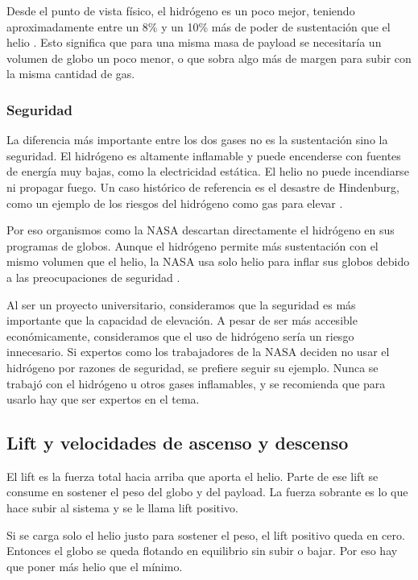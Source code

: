 \documentclass[12pt,a4paper]{article}
\begin{document}
Desde el punto de vista físico, el hidrógeno es un poco mejor, teniendo aproximadamente entre un 8\% y un 10\% más de poder de sustentación que el helio \cite{ref78}. Esto significa que para una misma masa de payload se necesitaría un volumen de globo un poco menor, o que sobra algo más de margen para subir con la misma cantidad de gas.

\subsubsection{Seguridad}\label{seguridad}

La diferencia más importante entre los dos gases no es la sustentación sino la seguridad. El hidrógeno es altamente inflamable y puede encenderse con fuentes de energía muy bajas, como la electricidad estática. El helio no puede incendiarse ni propagar fuego. Un caso histórico de referencia es el desastre de Hindenburg, como un ejemplo de los riesgos del hidrógeno como gas para elevar \cite{ref78}.

Por eso organismos como la NASA descartan directamente el hidrógeno en sus programas de globos. Aunque el hidrógeno permite más sustentación con el mismo volumen que el helio, la NASA usa solo helio para inflar sus globos debido a las preocupaciones de seguridad \cite{ref79}.

Al ser un proyecto universitario, consideramos que la seguridad es más importante que la capacidad de elevación. A pesar de ser más accesible económicamente, consideramos que el uso de hidrógeno sería un riesgo innecesario. Si expertos como los trabajadores de la NASA deciden no usar el hidrógeno por razones de seguridad, se prefiere seguir su ejemplo. Nunca se trabajó con el hidrógeno u otros gases inflamables, y se recomienda que para usarlo hay que ser expertos en el tema.

\subsection{Lift y velocidades de ascenso y descenso}\label{lift}


El lift es la fuerza total hacia arriba que aporta el helio. Parte de ese lift se consume en sostener el peso del globo y del payload. La fuerza sobrante es lo que hace subir al sistema y se le llama lift positivo.

Si se carga solo el helio justo para sostener el peso, el lift positivo queda en cero. Entonces el globo se queda flotando en equilibrio sin subir o bajar. Por eso hay que poner más helio que el mínimo.
\end{document}
